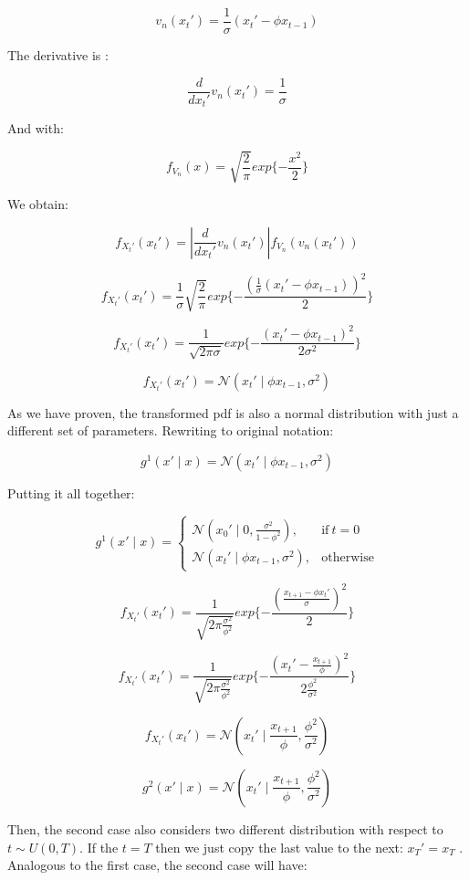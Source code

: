 \documentclass[]{article}
\begin{document}
$$ v_n(x_t') = \frac{1}{\sigma} ( x_t' - \phi x_{t-1})$$

The derivative is :

$$ \frac{d}{d x_t'} v_n(x_t') = \frac{1}{\sigma} $$

And with:

$$  f_{V_n}( x ) = \sqrt{\frac{2}{\pi}} exp\{ -\frac{x^2}{2} \} $$

We obtain:

$$ f_{X_t'}(x_t') = \left | \frac{d}{dx_t'} v_n(x_t') \right | f_{V_n}(v_n(x_t')) $$

$$ f_{X_t'}(x_t') = \frac{1}{\sigma} \sqrt{\frac{2}{\pi}} exp\{ -\frac{(\frac{1}{\sigma} ( x_t' - \phi x_{t-1}))^2}{2} \} $$

$$ f_{X_t'}(x_t') = \frac{1}{\sqrt{2 \pi \sigma}} exp\{ -\frac{( x_t' - \phi x_{t-1})^2}{2 \sigma^2} \} $$

$$ f_{X_t'}(x_t') = \mathcal{N}(x_t' \mid \phi x_{t-1}, \sigma^2) $$

As we have proven, the transformed pdf is also a normal distribution with just a different set of parameters. Rewriting to original notation:

$$ g^1(x' \mid x) = \mathcal{N}(x_t' \mid \phi x_{t-1}, \sigma^2) $$

Putting it all together:

\begin{equation}
g^1(x' \mid x)=
\begin{cases}
\mathcal{N}(x_0' \mid 0, \frac{\sigma^2}{1-\phi^2}), & \text{if}\ t=0 \\
\mathcal{N}(x_t' \mid \phi x_{t-1}, \sigma^2) , & \text{otherwise}
\end{cases}
\end{equation}

$$ f_{X_t'}(x_t') =  \frac{1}{ \sqrt{2 \pi \frac{\sigma^2}{\phi^2} }} exp\{ -\frac{ (\frac{x_{t+1} - \phi x_t'}{\sigma})^2}{2} \}$$

$$ f_{X_t'}(x_t') =  \frac{1}{ \sqrt{2 \pi \frac{\sigma^2}{\phi^2} }} exp\{ -\frac{ ( x_t' - \frac{x_{t+1}}{\phi} )^2}{2 \frac{\phi^2}{\sigma^2}} \}$$

$$ f_{X_t'}(x_t') = \mathcal{N}(x_t' \mid \frac{x_{t+1}}{\phi}, \frac{\phi^2}{\sigma^2}) $$


$$ g^2(x' \mid x) = \mathcal{N}(x_t' \mid \frac{x_{t+1}}{\phi}, \frac{\phi^2}{\sigma^2}) $$



Then, the second case also considers two different distribution with respect to $t \sim U(0,T)$. If the $t = T$ then we just copy the last value to the next: $x_T' = x_T$ .
Analogous to the first case, the second case will have: 
\end{document}
